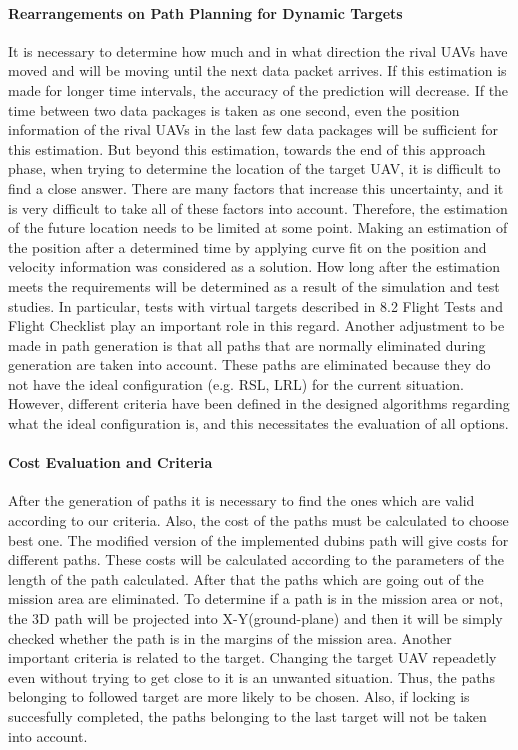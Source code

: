 \documentclass[12pt]{article}
\begin{document}
\paragraph{Rearrangements on Path Planning for Dynamic Targets}
\justify It is necessary to determine how much and in what direction the rival UAVs have moved and will be moving until the next data packet arrives. If this estimation is made for longer time intervals, the accuracy of the prediction will decrease. If the time between two data packages is taken as one second, even the position information of the rival UAVs in the last few data packages will be sufficient for this estimation. But beyond this estimation, towards the end of this approach phase, when trying to determine the location of the target UAV, it is difficult to find a close answer. There are many factors that increase this uncertainty, and it is very difficult to take all of these factors into account. Therefore, the estimation of the future location needs to be limited at some point.
\justify Making an estimation of the position after a determined time by applying curve fit on the position and velocity information was considered as a solution. How long after the estimation meets the requirements will be determined as a result of the simulation and test studies. In particular, tests with virtual targets described in 8.2 Flight Tests and Flight Checklist play an important role in this regard. 
\justify Another adjustment to be made in path generation is that all paths that are normally eliminated during generation are taken into account. These paths are eliminated because they do not have the ideal configuration (e.g. RSL, LRL) for the current situation. However, different criteria have been defined in the designed algorithms regarding what the ideal configuration is, and this necessitates the evaluation of all options.
\paragraph{Cost Evaluation and Criteria}
\justify After the generation of paths it is necessary to find the ones which are valid according to our criteria. Also, the cost of the paths must be calculated to choose best one. The modified version of the implemented dubins path will give costs for different paths. These costs will be calculated according to the parameters of the length of the path calculated. After that the paths which are going out of the mission area are eliminated. To determine if a path is in the mission area or not, the 3D path will be projected into X-Y(ground-plane) and then it will be simply checked whether the path is in the margins of the mission area. 
\justify Another important criteria is related to the target. Changing the target UAV repeadetly even without trying to get close to it is an unwanted situation. Thus, the paths belonging to followed target are more likely to be chosen. Also, if locking is succesfully completed, the paths belonging to the last target will not be taken into account. 
\end{document}
